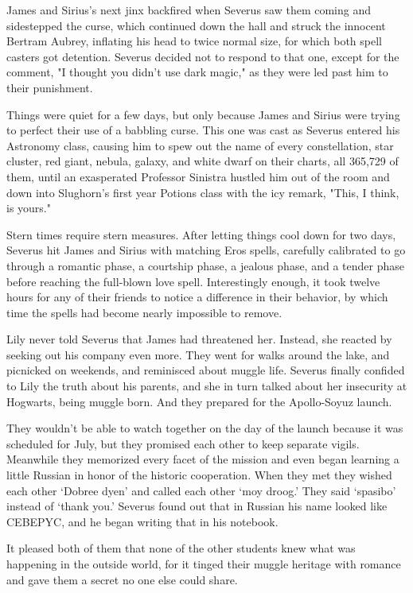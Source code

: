 James and Sirius's next jinx backfired when Severus saw them coming and sidestepped the curse, which continued down the hall and struck the innocent Bertram Aubrey, inflating his head to twice normal size, for which both spell casters got detention. Severus decided not to respond to that one, except for the comment, "I thought you didn't use dark magic," as they were led past him to their punishment.

Things were quiet for a few days, but only because James and Sirius were trying to perfect their use of a babbling curse. This one was cast as Severus entered his Astronomy class, causing him to spew out the name of every constellation, star cluster, red giant, nebula, galaxy, and white dwarf on their charts, all 365,729 of them, until an exasperated Professor Sinistra hustled him out of the room and down into Slughorn's first year Potions class with the icy remark, "This, I think, is yours."

Stern times require stern measures. After letting things cool down for two days, Severus hit James and Sirius with matching Eros spells, carefully calibrated to go through a romantic phase, a courtship phase, a jealous phase, and a tender phase before reaching the full-blown love spell. Interestingly enough, it took twelve hours for any of their friends to notice a difference in their behavior, by which time the spells had become nearly impossible to remove.

Lily never told Severus that James had threatened her. Instead, she reacted by seeking out his company even more. They went for walks around the lake, and picnicked on weekends, and reminisced about muggle life. Severus finally confided to Lily the truth about his parents, and she in turn talked about her insecurity at Hogwarts, being muggle born. And they prepared for the Apollo-Soyuz launch.

They wouldn't be able to watch together on the day of the launch because it was scheduled for July, but they promised each other to keep separate vigils. Meanwhile they memorized every facet of the mission and even began learning a little Russian in honor of the historic cooperation. When they met they wished each other `Dobree dyen' and called each other `moy droog.' They said `spasibo' instead of `thank you.' Severus found out that in Russian his name looked like CEBEPYC, and he began writing that in his notebook.

It pleased both of them that none of the other students knew what was happening in the outside world, for it tinged their muggle heritage with romance and gave them a secret no one else could share.

